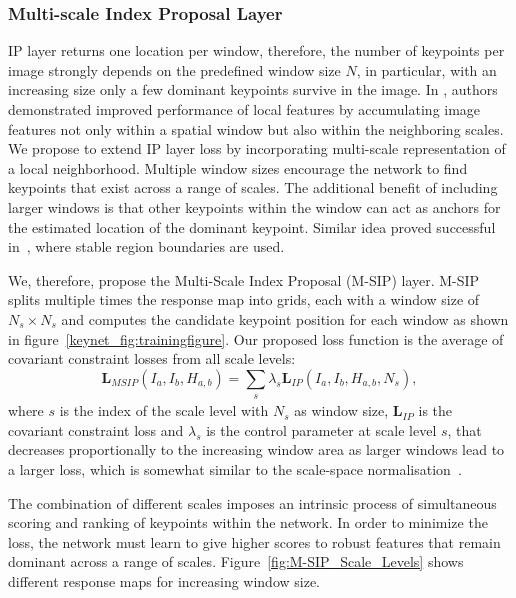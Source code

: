 \subsubsection{Multi-scale Index Proposal Layer}
\label{keynet_sec:multi_index_proposal_layer}

IP layer returns one location per window, therefore, the number of keypoints per image strongly depends on the predefined window size $N$, in particular, with an increasing size only a few dominant keypoints survive in the image. In \cite{DSPSIFT_soatto}, authors demonstrated improved performance of local features by accumulating image features not only within a spatial window but also within the neighboring scales. We propose to extend IP layer loss by incorporating multi-scale representation of a local neighborhood. Multiple window sizes encourage the network to find keypoints that exist across a range of scales. The additional benefit of including larger windows is that other keypoints within the window can act as anchors for the estimated location of the dominant keypoint. Similar idea proved successful in~\cite{Local_affine_frames_Matas}, where stable region boundaries are used.

We, therefore, propose the Multi-Scale Index Proposal (M-SIP) layer. M-SIP splits multiple times the response map into grids, each with a window size of $N_s \times N_s$ and computes the candidate keypoint position for each window as shown in figure~\ref{keynet_fig:trainingfigure}. Our proposed loss function is the average of covariant constraint losses from all scale levels: 
\begin{equation}
\mathbf{L}_{MSIP}(I_{a}, I_{b}, H_{a,b}) =  \sum_{\substack{s}}\lambda_{s} \mathbf{L}_{IP}(I_{a}, I_{b}, H_{a,b},N_s),
  \label{eq:context_losses_m}
\end{equation}
where $s$ is the index of the scale level with $N_s$ as window size, $\mathbf{L}_{IP}$ is the covariant constraint loss and $\lambda_{s}$ is the control parameter at scale level $s$, that decreases proportionally to the increasing window area as larger windows lead to a larger loss, which is somewhat similar to the scale-space normalisation~\cite{mikolajczykIJCV2004}. \par 

The combination of different scales imposes an intrinsic process of simultaneous scoring and ranking of keypoints within the network. In order to minimize the loss, the network must learn to give higher scores to robust features that remain dominant across a range of scales. Figure~\ref{fig:M-SIP_Scale_Levels} shows different response maps for increasing window size.

